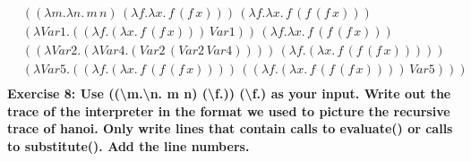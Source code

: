 \documentclass{article}
\theoremstyle{theorem}
\theoremstyle{definition}
\theoremstyle{remark}
\begin{document}
\begin{align*}
  &((\lambda m.\lambda n. \, m \, n) \, (\lambda f.\lambda x. \, f \, (f \, x))) \, (\lambda f.\lambda x. \, f \, (f \, (f \, x))) \\
  &(\lambda Var1.((\lambda f.(\lambda x. \, f \, (f \, x))) \, Var1)) \, (\lambda f.\lambda x. \, f \, (f \, (f \, x))) \\
  &((\lambda Var2.(\lambda Var4.(Var2 \, (Var2 \, Var4)))) \, (\lambda f.(\lambda x. \, f \, (f \, (f \, x))))) \\
  &(\lambda Var5.((\lambda f.(\lambda x. \, f \, (f \, (f \, x)))) \, ((\lambda f.(\lambda x. \, f \, (f \, (f \, x)))) \, Var5))) \\
\end{align*}
\textbf{Exercise 8: Use ((\textbackslash m.\textbackslash n. m n) (\textbackslash f.)) (\textbackslash f.) as your input. Write out the trace of the interpreter in the format we used to picture the recursive trace of hanoi. Only write lines that contain calls to evaluate() or calls to substitute(). Add the line numbers.}\\
\end{document}
